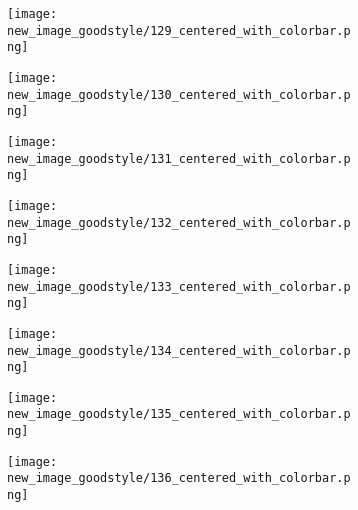 \documentclass[a4paper,12pt]{article}
\begin{document}
\begin{figure}[H]
  \begin{subfigure}{0.11\textwidth}
    \texttt{[image: new\_image\_goodstyle/129\_centered\_with\_colorbar.png]}
  \end{subfigure}
  \hfill
  \begin{subfigure}{0.11\textwidth}
    \texttt{[image: new\_image\_goodstyle/130\_centered\_with\_colorbar.png]}
  \end{subfigure}
  \hfill
  \begin{subfigure}{0.11\textwidth}
    \texttt{[image: new\_image\_goodstyle/131\_centered\_with\_colorbar.png]}
  \end{subfigure}
  \hfill
  \begin{subfigure}{0.11\textwidth}
    \texttt{[image: new\_image\_goodstyle/132\_centered\_with\_colorbar.png]}
  \end{subfigure}
  \hfill
  \begin{subfigure}{0.11\textwidth}
    \texttt{[image: new\_image\_goodstyle/133\_centered\_with\_colorbar.png]}
  \end{subfigure}
  \hfill
  \begin{subfigure}{0.11\textwidth}
    \texttt{[image: new\_image\_goodstyle/134\_centered\_with\_colorbar.png]}
  \end{subfigure}
  \hfill
  \begin{subfigure}{0.11\textwidth}
    \texttt{[image: new\_image\_goodstyle/135\_centered\_with\_colorbar.png]}
  \end{subfigure}
  \hfill
  \begin{subfigure}{0.11\textwidth}
    \texttt{[image: new\_image\_goodstyle/136\_centered\_with\_colorbar.png]}
  \end{subfigure}
  \hfill
\end{figure}
\end{document}
